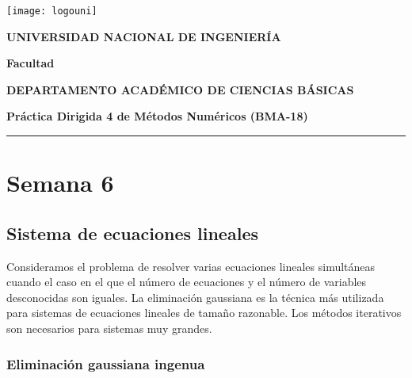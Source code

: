 


\providecommand{\faculty}{Facultad}
\noindent\parbox[c]{.18\textwidth}{\texttt{[image: logouni]}}\hfill
\parbox[c]{1\textwidth}{\raggedright%
    {\large\textbf{UNIVERSIDAD NACIONAL DE INGENIERÍA} \par\smallskip}
    {\large\textbf{\faculty} \par\smallskip}
    {\large\textbf{DEPARTAMENTO ACADÉMICO DE CIENCIAS BÁSICAS} \par\smallskip}
}

\begin{center}\bfseries\large
    Práctica Dirigida 4 de Métodos Numéricos (BMA-18)
\end{center}

\vspace{-0.5cm}

\hrulefill
\vspace{-2.5mm}

\rule{16.5cm}{0.8mm}

\section{Semana 6}

\subsection{Sistema de ecuaciones lineales}

Consideramos el problema de resolver varias ecuaciones lineales
simultáneas cuando el caso en el que el número de ecuaciones y el
número de variables desconocidas son iguales.
La eliminación gaussiana es la técnica más utilizada para sistemas de
ecuaciones lineales de tamaño razonable.
Los métodos iterativos son necesarios para sistemas muy grandes.

\subsubsection{Eliminación gaussiana ingenua}

